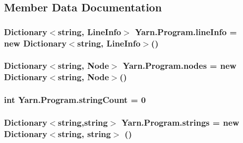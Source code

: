 \subsection{Member Data Documentation}
\hypertarget{a00124_a0d4da395947767b4a1eaaff8a9842adc}{
\subsubsection[{line\-Info}]{\setlength{\rightskip}{0pt plus 5cm}Dictionary$<$string, {\bf Line\-Info}$>$ Yarn.\-Program.\-line\-Info = new Dictionary$<$string, {\bf Line\-Info}$>$()\hspace{0.3cm}{\ttfamily [package]}}}\label{a00124_a0d4da395947767b4a1eaaff8a9842adc}
\hypertarget{a00124_a3f4928a577c88263ad016be259b175c4}{
\subsubsection[{nodes}]{\setlength{\rightskip}{0pt plus 5cm}Dictionary$<$string, {\bf Node}$>$ Yarn.\-Program.\-nodes = new Dictionary$<$string, {\bf Node}$>$()\hspace{0.3cm}{\ttfamily [package]}}}\label{a00124_a3f4928a577c88263ad016be259b175c4}
\hypertarget{a00124_a8ef1d10094ef00311aade6715ba78ec7}{
\subsubsection[{string\-Count}]{\setlength{\rightskip}{0pt plus 5cm}int Yarn.\-Program.\-string\-Count = 0\hspace{0.3cm}{\ttfamily [private]}}}\label{a00124_a8ef1d10094ef00311aade6715ba78ec7}
\hypertarget{a00124_a91518fda7e41bf573f66c6946dd3b4cb}{
\subsubsection[{strings}]{\setlength{\rightskip}{0pt plus 5cm}Dictionary$<$string,string$>$ Yarn.\-Program.\-strings = new Dictionary$<$string, string$>$ ()\hspace{0.3cm}{\ttfamily [package]}}}\label{a00124_a91518fda7e41bf573f66c6946dd3b4cb}


